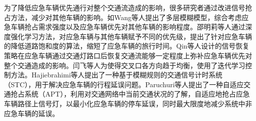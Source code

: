 



为了降低应急车辆优先通行对整个交通流造成的影响，很多研究者通过改进信号抢占方法，减少对其他车辆的影响。如Wang等人\cite{wang_design_2013}提出了多层模糊模型，综合考虑应急车辆抢占需求强度以及应急车辆优先对其他车辆的影响程度。邵明莉等人\cite{shaomingli}通过深度强化学习方法，对应急车辆与其他车辆赋予不同的优先级，提出了针对应急车辆的降低道路饱和度的算法，缩短了应急车辆的旅行时间。Qin等人\cite{qin_control_2012}设计的信号恢复策略在应急车辆通过交通灯路口后恢复交通流能够一定程度上弥补应急车辆优先对整个交通造成的影响。闫飞等人\cite{yanfei}为使得交叉口各方向趋于均衡，使用了迭代学习控制方法。Hajiebrahimi等人提出了一种基于模糊规则的交通信号计时系统（STC），用于解决应急车辆的行程延误问题。Paruchuri等人提出了一种自适应交通抢占系统（APT），利用对交通网络中当前交通状况的了解，自适应地抢占应急车辆路径上信号灯，以最小化应急车辆的停车延误，同时最大限度地减少系统中非应急车辆的延误。


